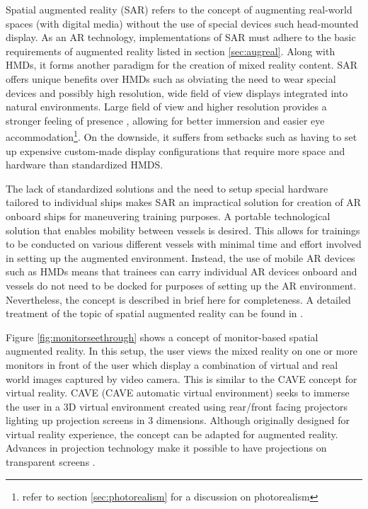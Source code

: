 Spatial augmented reality (SAR) refers to the concept of augmenting real-world spaces (with digital media) without the use of special devices such head-mounted display. As an AR technology, implementations of SAR must adhere to the basic requirements of augmented reality listed in section \ref{sec:augreal}. Along with HMDs, it forms another paradigm for the creation of mixed reality content. SAR offers unique benefits over HMDs such as obviating the need to wear special devices and possibly high resolution, wide field of view displays integrated into natural environments. Large field of view and higher resolution provides a stronger feeling of presence \parencite{lantz1996future}, allowing for better immersion and easier eye accommodation\footnote{refer to section \ref{sec:photorealism} for a discussion on photorealism}. On the downside, it suffers from setbacks such as having to set up expensive custom-made display configurations that require more space and hardware than standardized HMDS. 

The lack of standardized solutions and the need to setup special hardware tailored to individual ships makes SAR an impractical solution for creation of AR onboard ships for maneuvering training purposes. A portable technological solution that enables mobility between vessels is desired. This allows for trainings to be conducted on various different vessels with minimal time and effort involved in setting up the augmented environment. Instead, the use of mobile AR devices such as HMDs means that trainees can carry individual AR devices onboard and vessels do not need to be docked for purposes of setting up the AR environment. Nevertheless, the concept is described in brief here for completeness. A detailed treatment of the topic of spatial augmented reality can be found in \cite{bimber2005spatial}.

Figure \ref{fig:monitorseethrough} shows a concept of monitor-based spatial augmented reality. In this setup, the user views the mixed reality on one or more monitors in front of the user which display a combination of virtual and real world images captured by video camera. This is similar to the CAVE \parencite{cruz1993surround} concept for virtual reality. CAVE (CAVE automatic virtual environment) seeks to immerse the user in a 3D virtual environment created using rear/front facing projectors lighting up projection screens in 3 dimensions. Although originally designed for virtual reality experience, the concept can be adapted for augmented reality. Advances in projection technology make it possible to have projections on transparent screens \parencite{peterson2006human}. 

